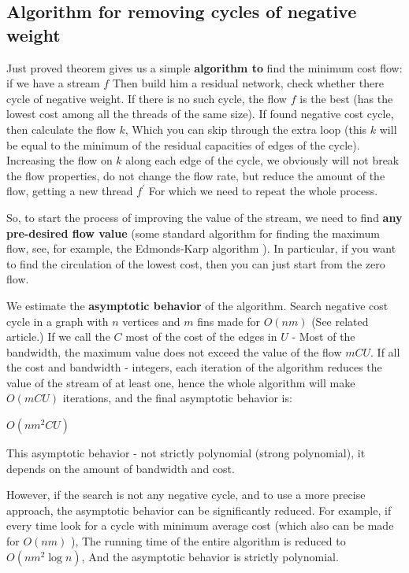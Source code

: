 \subsection{ Algorithm for removing cycles of negative weight }

Just proved theorem gives us a simple \textbf{algorithm to} find the minimum cost flow: if we have a stream $f$ Then build him a residual network, check whether there cycle of negative weight. If there is no such cycle, the flow $f$ is the best (has the lowest cost among all the threads of the same size). If found negative cost cycle, then calculate the flow $k$, Which you can skip through the extra loop (this $k$ will be equal to the minimum of the residual capacities of edges of the cycle). Increasing the flow on $k$ along each edge of the cycle, we obviously will not break the flow properties, do not change the flow rate, but reduce the amount of the flow, getting a new thread $f ^ \prime$ For which we need to repeat the whole process.

So, to start the process of improving the value of the stream, we need to find \textbf{any pre-desired flow value} (some standard algorithm for finding the maximum flow, see, for example, the Edmonds-Karp algorithm ). In particular, if you want to find the circulation of the lowest cost, then you can just start from the zero flow.

We estimate the \textbf{asymptotic behavior} of the algorithm. Search negative cost cycle in a graph with $n$ vertices and $m$ fins made for $O (nm)$ (See related article.) If we call the $C$ most of the cost of the edges in $U$ - Most of the bandwidth, the maximum value does not exceed the value of the flow $mCU$. If all the cost and bandwidth - integers, each iteration of the algorithm reduces the value of the stream of at least one, hence the whole algorithm will make $O (mCU)$ iterations, and the final asymptotic behavior is:

$O (nm ^ 2CU)$

This asymptotic behavior - not strictly polynomial (strong polynomial), it depends on the amount of bandwidth and cost.

However, if the search is not any negative cycle, and to use a more precise approach, the asymptotic behavior can be significantly reduced. For example, if every time look for a cycle with minimum average cost (which also can be made for $O (nm)$ ), The running time of the entire algorithm is reduced to $O (nm ^ 2 \log n)$, And the asymptotic behavior is strictly polynomial.

